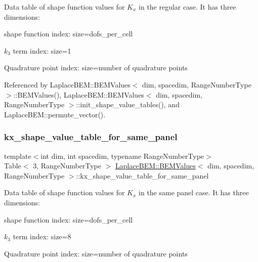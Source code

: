 Data table of shape function values for $K_x$ in the regular case. It has three dimensions\+:
\begin{DoxyEnumerate}
\item shape function index\+: size={\ttfamily dofs\+\_\+per\+\_\+cell} 
\item $k_3$ term index\+: size=1
\item Quadrature point index\+: size=number of quadrature points 
\end{DoxyEnumerate}

Referenced by Laplace\+B\+E\+M\+::\+B\+E\+M\+Values$<$ dim, spacedim, Range\+Number\+Type $>$\+::\+B\+E\+M\+Values(), Laplace\+B\+E\+M\+::\+B\+E\+M\+Values$<$ dim, spacedim, Range\+Number\+Type $>$\+::init\+\_\+shape\+\_\+value\+\_\+tables(), and Laplace\+B\+E\+M\+::permute\+\_\+vector().

\mbox{\label{classLaplaceBEM_1_1BEMValues_af837344cd836aa6ed93fcf6307157174}} 
\subsubsection{\texorpdfstring{kx\+\_\+shape\+\_\+value\+\_\+table\+\_\+for\+\_\+same\+\_\+panel}{kx\_shape\_value\_table\_for\_same\_panel}}
{\footnotesize\ttfamily template$<$int dim, int spacedim, typename Range\+Number\+Type$>$ \\
Table$<$ 3, Range\+Number\+Type $>$ \hyperlink{classLaplaceBEM_1_1BEMValues}{Laplace\+B\+E\+M\+::\+B\+E\+M\+Values}$<$ dim, spacedim, Range\+Number\+Type $>$\+::kx\+\_\+shape\+\_\+value\+\_\+table\+\_\+for\+\_\+same\+\_\+panel}

Data table of shape function values for $K_x$ in the same panel case. It has three dimensions\+:
\begin{DoxyEnumerate}
\item shape function index\+: size={\ttfamily dofs\+\_\+per\+\_\+cell} 
\item $k_3$ term index\+: size=8
\item Quadrature point index\+: size=number of quadrature points 
\end{DoxyEnumerate}

